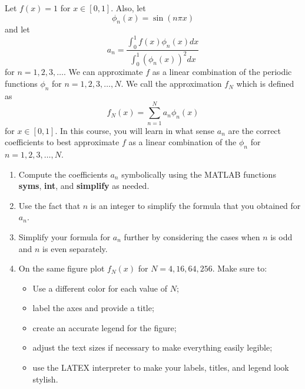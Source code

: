 
Let $f(x)=1$ for $x\in[0,1]$. Also, let
\[
\phi_n(x)=\sin(n\pi x)
\]
and let
\[
a_n=\frac{\displaystyle{\int_0^1 f(x)\phi_n(x) dx}}{\displaystyle{\int_0^1 (\phi_n(x))^2 dx}}
\]
for $n=1,2,3,\ldots$. We can approximate $f$ as a linear combination of the periodic functions $\phi_n$ for $n=1,2,3,\ldots,N$.  We call the approximation $f_N$ which is defined as
\[
f_N(x)=\sum_{n=1}^N a_n \phi_n(x)
\]
 for $x\in[0,1]$. In this course, you will learn in what sense $a_n$ are the correct coefficients to best approximate $f$ as a linear combination of the $\phi_n$ for $n=1,2,3,\ldots,N$.
\begin{enumerate}
\item Compute the coefficients $a_n$ symbolically using the MATLAB functions {\bf syms}, {\bf int}, and {\bf simplify} as needed.
\\
\item Use the fact that $n$ is an integer to simplify the formula that you obtained for $a_n$.
\\
\item Simplify your formula for $a_n$ further by considering the cases when $n$ is odd and $n$ is even separately.
\\
\item On the same figure plot $f_N(x)$ for $N=4,16,64,256$. Make sure to:
\begin{itemize}
\item Use a different color for each value of $N$;
\item label the axes and provide a title;
\item create an accurate legend for the figure;
\item adjust the text sizes if necessary to make everything easily legible;
\item use the LATEX interpreter to make your labels, titles, and legend look stylish.
\end{itemize}
\end{enumerate}



